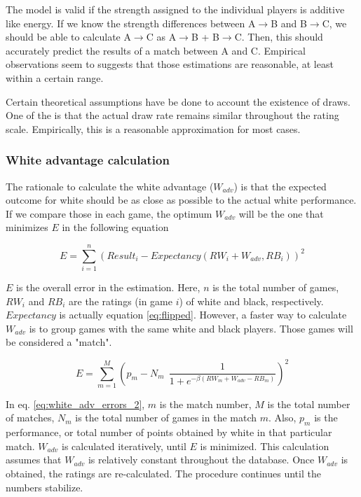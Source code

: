 \documentclass[12pt]{article}
\begin{document}
The model is valid if the strength assigned to the individual players is additive like energy. 
If we know the strength differences between A$\to$B and B$\to$C, we should be able to calculate A$\to$C as A$\to$B + B$\to$C.
Then, this should accurately predict the results of a match between A and C. 
Empirical observations seem to suggests that those estimations are reasonable, at least within a certain range. 

Certain theoretical assumptions have be done to account the existence of draws. 
One of the is that the actual draw rate remains similar throughout the rating scale.
Empirically, this is a reasonable approximation for most cases.

\subsubsection*{White advantage calculation}

The rationale to calculate the white advantage ($W_{adv}$) is that the expected outcome for white should be as close as possible to the actual white performance.
If we compare those in each game, the optimum $W_{adv}$ will be the one that minimizes $E$ in the following equation

	\begin{equation} \label{eq:white_adv_errors_1}
	E = \sum\limits_{i=1}^n (Result_{i} - Expectancy(RW_{i} + W_{adv}, RB_{i}))^2
	\end{equation}

$E$ is the overall error in the estimation.
Here, $n$ is the total number of games, $RW_{i}$ and $RB_{i}$ are the ratings (in game $i$) of white and black, respectively.
$Expectancy$ is actually equation \ref{eq:flipped}.
However, a faster way to calculate $W_{adv}$ is to group games with the same white and black players. 
Those games will be considered a "match".

	\begin{equation} \label{eq:white_adv_errors_2}
	E = \sum\limits_{m=1}^M \left(p_{m} - N_{m}\:\: \frac{1}{1 + e^{-\beta(RW_{m} + W_{adv}-RB_{m})}}	\right)^2
	\end{equation}

In eq. \ref{eq:white_adv_errors_2}, $m$ is the match number, $M$ is the total number of matches, $N_{m}$ is the total number of games in the match $m$.
Also, $p_{m}$ is the performance, or total number of points obtained by white in that particular match.
$W_{adv}$ is calculated iteratively, until $E$ is minimized.
This calculation assumes that $W_{adv}$ is relatively constant throughout the database.
Once $W_{adv}$ is obtained, the ratings are re-calculated.
The procedure continues until the numbers stabilize.
\end{document}

